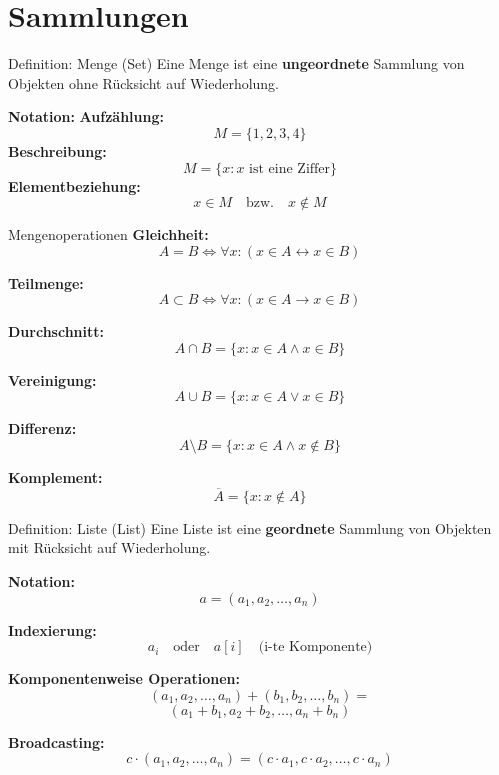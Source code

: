 \documentclass[a4paper, fontsize=7pt]{scrartcl}
\begin{document}
\section{Sammlungen}

\begin{mainbox}{Definition: Menge (Set)}
Eine Menge ist eine \textbf{ungeordnete} Sammlung von Objekten ohne Rücksicht auf Wiederholung.

\textbf{Notation:}
\textbf{Aufzählung:}
\[M = \{1, 2, 3, 4\}\]
\textbf{Beschreibung:}
\[M = \{x : x \text{ ist eine Ziffer}\}\]
\textbf{Elementbeziehung:}
\[x \in M \quad \text{bzw.} \quad x \notin M\]
\end{mainbox}

\begin{mainbox}{Mengenoperationen}
\textbf{Gleichheit:}
$$A = B \iff \forall x: (x \in A \leftrightarrow x \in B)$$

\textbf{Teilmenge:}
$$A \subset B \iff \forall x: (x \in A \rightarrow x \in B)$$

\textbf{Durchschnitt:}
$$A \cap B = \{x : x \in A \land x \in B\}$$

\textbf{Vereinigung:}
$$A \cup B = \{x : x \in A \lor x \in B\}$$

\textbf{Differenz:}
$$A \setminus B = \{x : x \in A \land x \notin B\}$$

\textbf{Komplement:}
$$\overline{A} = \{x : x \notin A\}$$
\end{mainbox}

\begin{mainbox}{Definition: Liste (List)}
Eine Liste ist eine \textbf{geordnete} Sammlung von Objekten mit Rücksicht auf Wiederholung.

\textbf{Notation:}
$$a = (a_1, a_2, \ldots, a_n)$$

\textbf{Indexierung:}
$$a_i \quad \text{oder} \quad a[i] \quad \text{(i-te Komponente)}$$

\textbf{Komponentenweise Operationen:}
\[(a_1, a_2, \ldots, a_n) + (b_1, b_2, \ldots, b_n) = \]
\[(a_1+b_1, a_2+b_2, \ldots, a_n+b_n)\]

\textbf{Broadcasting:}
$$c \cdot (a_1, a_2, \ldots, a_n) = (c \cdot a_1, c \cdot a_2, \ldots, c \cdot a_n)$$
\end{mainbox}
\end{document}
